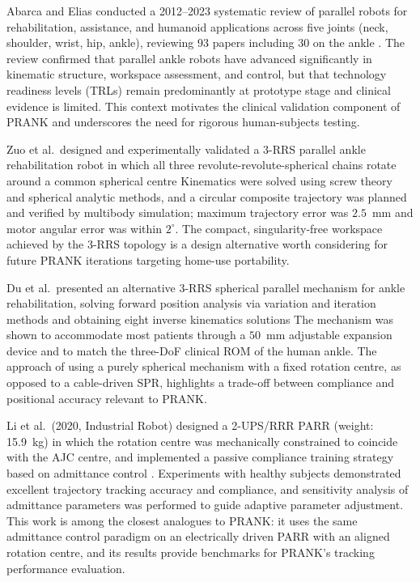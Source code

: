 Abarca and Elias conducted a 2012--2023 systematic review of parallel robots for rehabilitation, assistance, and humanoid applications across five joints (neck, shoulder, wrist, hip, ankle), reviewing 93 papers including 30 on the ankle \cite{ShahNazar2022}.
The review confirmed that parallel ankle robots have advanced significantly in kinematic structure, workspace assessment, and control, but that technology readiness levels (TRLs) remain predominantly at prototype stage and clinical evidence is limited.
This context motivates the clinical validation component of PRANK and underscores the need for rigorous human-subjects testing.

Zuo et al.\ designed and experimentally validated a 3-RRS parallel ankle rehabilitation robot in which all three revolute-revolute-spherical chains rotate around a common spherical centre %
Kinematics were solved using screw theory and spherical analytic methods, and a circular composite trajectory was planned and verified by multibody simulation; maximum trajectory error was $2.5$~mm and motor angular error was within $2^{\circ}$.
The compact, singularity-free workspace achieved by the 3-RRS topology is a design alternative worth considering for future PRANK iterations targeting home-use portability.

Du et al.\ presented an alternative 3-RRS spherical parallel mechanism for ankle rehabilitation, solving forward position analysis via variation and iteration methods and obtaining eight inverse kinematics solutions %
The mechanism was shown to accommodate most patients through a $50$~mm adjustable expansion device and to match the three-DoF clinical ROM of the human ankle.
The approach of using a purely spherical mechanism with a fixed rotation centre, as opposed to a cable-driven SPR, highlights a trade-off between compliance and positional accuracy relevant to PRANK.

Li et al.\ (2020, Industrial Robot) designed a 2-UPS/RRR PARR (weight: 15.9~kg) in which the rotation centre was mechanically constrained to coincide with the AJC centre, and implemented a passive compliance training strategy based on admittance control \cite{Li2020passive}.
Experiments with healthy subjects demonstrated excellent trajectory tracking accuracy and compliance, and sensitivity analysis of admittance parameters was performed to guide adaptive parameter adjustment.
This work is among the closest analogues to PRANK: it uses the same admittance control paradigm on an electrically driven PARR with an aligned rotation centre, and its results provide benchmarks for PRANK's tracking performance evaluation.


